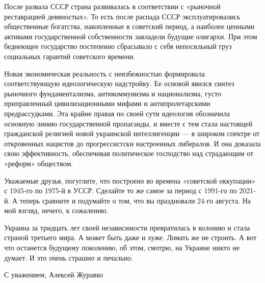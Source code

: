 После развала СССР страна развивалась в соответствии с «рыночной реставрацией
девяностых». То есть после распада СССР эксплуатировались общественные
богатства, накопленные в советский период, а наиболее ценными активами
государственной собственности завладели будущие олигархи. При этом беднеющее
государство постепенно сбрасывало с себя непосильный груз социальных гарантий
советского времени. 

Новая экономическая реальность с неизбежностью формировала соответствующую
идеологическую надстройку. Ее основой явился синтез рыночного фундаментализма,
антикоммунизма и национализма, густо приправленный цивилизационными мифами и
антипролетарскими предрассудками. Эта крайне правая по своей сути идеология
обозначила основную линию государственной пропаганды, и вместе с тем стала
настоящей гражданской религией новой украинской интеллигенции — в широком
спектре от откровенных нацистов до прогрессистски настроенных либералов. И она
доказала свою эффективность, обеспечивая политическое господство над страдающим
от «реформ» обществом. 

Уважаемые друзья, погуглите, что построено во времена «советской оккупации» с
1945-го по 1975-й в УССР. Сделайте то же самое за период с 1991-го по 2021-й.
А теперь сравните и подумайте о том, что вы праздновали 24-го августа. На мой
взгляд, нечего, к сожалению. 

Украина за тридцать лет своей независимости превратилась в колонию и стала
страной третьего мира. А может быть даже и хуже. Ломать же не строить. А вот
что останется будущему поколению, об этом, смотрю, на Украине никто не думает.
И это очень страшно и печально.

С уважением, 
Алексей Журавко
